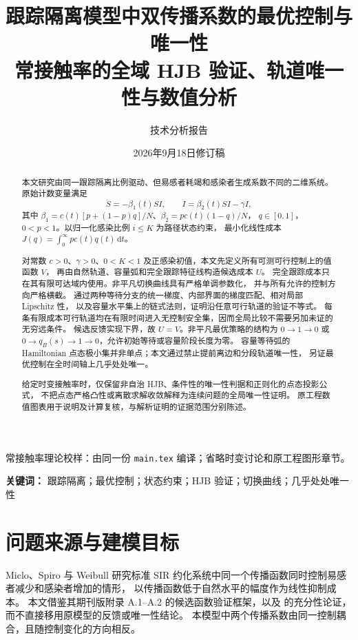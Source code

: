 \documentclass[11pt,a4paper,UTF8]{ctexart}
\title{\bfseries 跟踪隔离模型中双传播系数的最优控制与唯一性\\[2mm]
\large 常接触率的全域 HJB 验证、轨道唯一性与数值分析}
\author{技术分析报告}
\date{2026年9月18日修订稿}
\theoremstyle{definition}
\newcommand{\dd}{\,\mathrm d}
\begin{document}
\maketitle
\ifdefined\TheoryOnly
\begin{center}\small 常接触率理论校样：由同一份 \texttt{main.tex} 编译；省略时变讨论和原工程图形章节。\end{center}
\fi
\begin{abstract}
本文研究由同一跟踪隔离比例驱动、但易感者耗竭和感染者生成系数不同的二维系统。
原始计数变量满足
\[
\dot S=-\beta_1(t)SI,\qquad \dot I=\beta_2(t)SI-\gamma I,
\]
其中 $\beta_1=c(t)[p+(1-p)q]/N$、$\beta_2=pc(t)(1-q)/N$，
$q\in[0,1]$，$0<p<1$。以归一化感染比例 $i\le K$ 为路径状态约束，
最小化线性成本 $J(q)=\int_0^\infty pc(t)q(t)\dd t$。

对常数 $c>0$、$\gamma>0$、$0<K<1$ 及正感染初值，本文先定义所有可测可行控制上的值函数 $V$，
再由自然轨道、容量弧和完全跟踪特征线构造候选成本 $U$。
完全跟踪成本只在其有限可达域内使用。非平凡切换曲线具有严格单调参数化，
并与所有允许的控制方向严格横截。
通过两种等待分支的统一梯度、内部界面的梯度匹配、相对局部 Lipschitz 性，
以及容量水平集上的链式法则，证明沿任意可行轨道的验证不等式。
每条有限成本可行轨道均在有限时间进入无控制安全集，因而全局比较不需要另加未证的无穷远条件。
候选反馈实现下界，故 $U=V$。非平凡最优策略的结构为
$0\to1\to0$ 或 $0\to q_B(s)\to1\to0$，允许初始等待或容量阶段长度为零。
容量等待弧的 Hamiltonian 点态极小集并非单点；本文通过禁止提前离边和分段轨道唯一性，
另证最优控制在全时间轴上几乎处处唯一。

给定时变接触率时，仅保留非自治 HJB、条件性的唯一性判据和正则化的点态投影公式，
不把点态严格凸性或离散求解收敛解释为连续问题的全局唯一性证明。
原工程数值图表用于说明及计算复核，与解析证明的证据范围分别陈述。
\end{abstract}
\noindent\textbf{关键词：} 跟踪隔离；最优控制；状态约束；HJB 验证；切换曲线；几乎处处唯一性
\tableofcontents\newpage

\section{问题来源与建模目标}
\label{sec:model}
Miclo、Spiro 与 Weibull 研究标准 SIR 约化系统中同一个传播函数同时控制易感者减少和感染者增加的情形，
以传播函数低于自然水平的幅度作为线性抑制成本\citep{MicloSpiroWeibull2022}。
本文借鉴其期刊版附录 A.1--A.2 的候选函数验证框架，以及
\citet[\S5.1.4]{Liberzon2012} 的充分性论证，而不直接移用原模型的反馈或唯一性结论。
本模型中两个传播系数由同一控制耦合，且随控制变化的方向相反。
\end{document}
